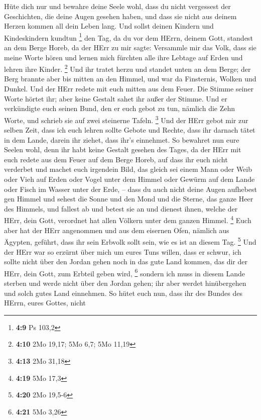  Hüte dich nur und bewahre deine Seele wohl, dass du nicht
vergessest der Geschichten, die deine Augen gesehen haben, und dass sie
nicht aus deinem Herzen kommen all dein Leben lang. Und sollst deinen
Kindern und Kindeskindern kundtun \footnote{\textbf{4:9} Ps 103,2}
 den Tag, da du vor dem HErrn, deinem Gott, standest an dem
Berge Horeb, da der HErr zu mir sagte: Versammle mir das Volk, dass sie
meine Worte hören und lernen mich fürchten alle ihre Lebtage auf Erden
und lehren ihre Kinder. \footnote{\textbf{4:10} 2Mo 19,17; 5Mo 6,7; 5Mo
  11,19}  Und ihr tratet herzu und standet unten an dem
Berge; der Berg brannte aber bis mitten an den Himmel, und war da
Finsternis, Wolken und Dunkel.  Und der HErr redete mit
euch mitten aus dem Feuer. Die Stimme seiner Worte hörtet ihr; aber
keine Gestalt sahet ihr außer der Stimme.  Und er
verkündigte euch seinen Bund, den er euch gebot zu tun, nämlich die Zehn
Worte, und schrieb sie auf zwei steinerne Tafeln. \footnote{\textbf{4:13}
  2Mo 31,18}  Und der HErr gebot mir zur selben Zeit, dass
ich euch lehren sollte Gebote und Rechte, dass ihr darnach tätet in dem
Lande, darein ihr ziehet, dass ihr's einnehmet.  So
bewahret nun eure Seelen wohl, denn ihr habt keine Gestalt gesehen des
Tages, da der HErr mit euch redete aus dem Feuer auf dem Berge Horeb,
 auf dass ihr euch nicht verderbet und machet euch
irgendein Bild, das gleich sei einem Mann oder Weib  oder
Vieh auf Erden oder Vogel unter dem Himmel  oder Gewürm auf
dem Lande oder Fisch im Wasser unter der Erde, --  dass du
auch nicht deine Augen aufhebest gen Himmel und sehest die Sonne und den
Mond und die Sterne, das ganze Heer des Himmels, und fallest ab und
betest sie an und dienest ihnen, welche der HErr, dein Gott, verordnet
hat allen Völkern unter dem ganzen Himmel. \footnote{\textbf{4:19} 5Mo
  17,3}  Euch aber hat der HErr angenommen und aus dem
eisernen Ofen, nämlich aus Ägypten, geführt, dass ihr sein Erbvolk sollt
sein, wie es ist an diesem Tag. \footnote{\textbf{4:20} 2Mo 19,5-6}
 Und der HErr war so erzürnt über mich um eures Tuns
willen, dass er schwur, ich sollte nicht über den Jordan gehen noch in
das gute Land kommen, das dir der HErr, dein Gott, zum Erbteil geben
wird, \footnote{\textbf{4:21} 5Mo 3,26}  sondern ich muss
in diesem Lande sterben und werde nicht über den Jordan gehen; ihr aber
werdet hinübergehen und solch gutes Land einnehmen.  So
hütet euch nun, dass ihr des Bundes des HErrn, eures Gottes, nicht
